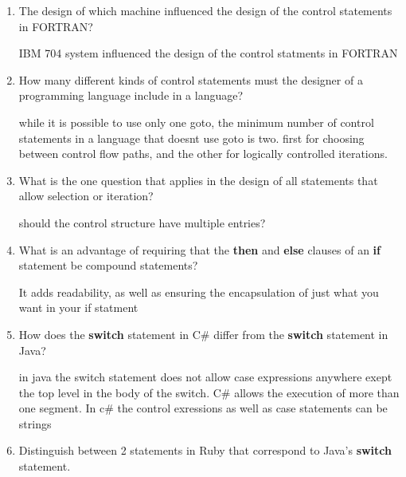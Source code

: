 \begin{enumerate}
  \item The design of which machine influenced the design
    of the control statements in FORTRAN?
    \begin{answer}
    IBM 704 system influenced the design of the control statments in FORTRAN
    \end{answer}
  \item How many different kinds of control statements
    must the designer of a programming language include
    in a language?
    \begin{answer}
      while it is possible to use only one goto, the minimum number of control statements in a language that doesnt use goto is two. first for choosing between control flow paths, and the other for logically controlled iterations.
      \end{answer}

  \item What is the one question that applies in the
    design of all statements that allow selection or
    iteration?
    \begin{answer}
      should the control structure have multiple entries?
      \end{answer}

  \item What is an advantage of requiring that
    the \textbf{then} and \textbf{else} clauses of
    an \textbf{if} statement be compound statements?

    \begin{answer}
      It adds readability, as well as ensuring the encapsulation of just what you want in your if statment
    \end{answer}


  \item How does the \textbf{switch} statement in C\#
    differ from the \textbf{switch} statement in Java?
    
    \begin{answer}
      in java the switch statement does not allow case expressions anywhere exept the top level in the body of the switch. C\# 
allows the execution of more than one segment. In c\# the control exressions as well as case statements can be strings
    \end{answer}

  \item Distinguish between 2 statements in Ruby
    that correspond to Java's \textbf{switch} statement.


\end{enumerate}
